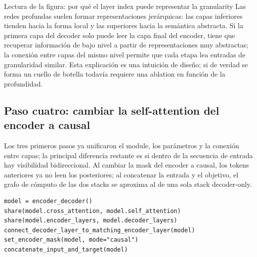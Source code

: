 

\begin{knowledgebox}{Lectura de la figura: por qué el layer index puede representar la granularity}
Las redes profundas suelen formar representaciones jerárquicas: las capas inferiores tienden hacia la forma local y las superiores hacia la semántica abstracta. Si la primera capa del decoder solo puede leer la capa final del encoder, tiene que recuperar información de bajo nivel a partir de representaciones muy abstractas; la conexión entre capas del mismo nivel permite que cada etapa lea entradas de granularidad similar. Esta explicación es una intuición de diseño; si de verdad se forma un cuello de botella todavía requiere una ablation en función de la profundidad.
\end{knowledgebox}

\subsection{Paso cuatro: cambiar la self-attention del encoder a causal}

Los tres primeros pasos ya unificaron el module, los parámetros y la conexión entre capas; la principal diferencia restante es si dentro de la secuencia de entrada hay visibilidad bidireccional. Al cambiar la mask del encoder a causal, los tokens anteriores ya no leen los posteriores; al concatenar la entrada y el objetivo, el grafo de cómputo de las dos stacks se aproxima al de una sola stack decoder-only.



\begin{lstlisting}[caption={Pseudocódigo conceptual de la architecture transformation en cuatro pasos}]
model = encoder_decoder()
share(model.cross_attention, model.self_attention)
share(model.encoder_layers, model.decoder_layers)
connect_decoder_layer_to_matching_encoder_layer(model)
set_encoder_mask(model, mode="causal")
concatenate_input_and_target(model)
\end{lstlisting}


